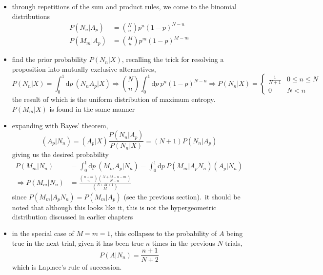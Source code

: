 \documentclass[../jaynes_prob_theory_notes.tex]{subfiles}
\begin{document}
\begin{itemize}
\begin{itemize}
                    \end{itemize}
                \item through repetitions of the sum and product rules, we come to the binomial distributions
                    \begin{align*} 
                        P(N_n|A_p) &= \binom{N}{n} p^n{(1-p)}^{N-n} \\
                        P(M_m|A_p) &= \binom{M}{n} p^m{(1-p)}^{M-m}
                    \end{align*}
                \item find the prior probability \(P(N_n|X)\), recalling the trick for resolving a proposition into mutually exclusive alternatives,
                    \begin{equation*} 
                        P(N_n|X) = \int^{1}_{0}\text{d}p~(N_n A_p | X) \Rightarrow \binom{N}{n}\int^{1}_{0}\text{d}p~p^n{(1-p)}^{N-n}
                        \Rightarrow P(N_n|X) = \left \{\begin{matrix} \frac{1}{N+1} & 0 \leq n \leq N \\ 0 & N < n \end{matrix} \right.
                    \end{equation*}
                    the result of which is the uniform distribution of maximum entropy.\ \(P(M_m | X)\) is found in the same manner
                \item expanding with Bayes' theorem,
                    \begin{equation*} 
                        (A_p|N_n) = (A_p | X) \frac{P(N_n|A_p)}{P(N_n|X)} = (N+1)P(N_n|A_p)
                    \end{equation*}
                    giving us the desired probability
                    \begin{align} 
                        P(M_m|N_n) &= \int^{1}_{0}\text{d}p~(M_m A_p | N_n) = \int^{1}_{0}\text{d}p~P(M_m|A_p N_n)(A_p|N_n) \\
                        \label{laplace}
                        \Rightarrow P(M_m|N_n) &= \frac{\binom{n+m}{n} \binom{N+M-n-m}{N-n}}{\binom{N+M+1}{M}}
                    \end{align}
                    since \(P(M_m|A_p N_n) = P(M_m|A_p)\) (see the previous section).\ it should be noted that although this looks like it, this is not the hypergeometric distribution discussed in earlier chapters
                \item in the special case of \(M=m=1\), this collapses to the probability of \(A\) being true in the next trial, given it has been true \(n\) times in the previous \(N\) trials,
                    \begin{equation*} 
                        P(A|N_n) = \frac{n+1}{N+2}
                    \end{equation*}
                    which is Laplace's rule of succession.
            \end{itemize}
\end{document}
